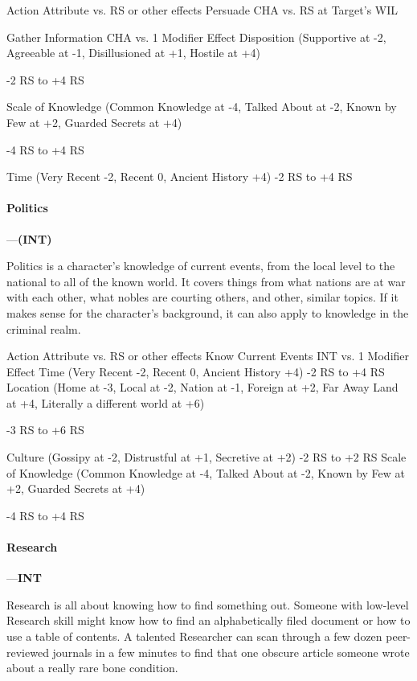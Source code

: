 \documentclass[oneside,11pt,english]{book}
\begin{document}
Action Attribute vs. RS or 
other effects 
Persuade CHA vs. RS at Target’s 
WIL 


Gather Information CHA vs. 1 
Modifier Effect 
Disposition (Supportive at -2, Agreeable at -1, Disillusioned at +1, Hostile at +4)

-2 RS to +4 RS 

Scale of Knowledge (Common Knowledge at -4, Talked About at -2, Known 
by Few at +2, Guarded Secrets at +4) 

-4 RS to +4 RS 

Time (Very Recent -2, Recent 0, Ancient History +4) -2 RS to +4 RS 

 

 

 

\paragraph{\label{skill:Politics}Politics}---\quad\textbf{(INT) }\par
Politics is a character’s knowledge of current events, from the local level to the national to all of the 
known world. It covers things from what nations are at war with each other, what nobles are courting 
others, and other, similar topics. If it makes sense for the character’s background, it can also apply to 
knowledge in the criminal realm. 

 

Action Attribute vs. RS or 
other effects 
Know Current Events INT vs. 1 
Modifier Effect 
Time (Very Recent -2, Recent 0, Ancient History +4) -2 RS to +4 RS 
Location (Home at -3, Local at -2, Nation at -1, Foreign at +2, Far Away Land 
at +4, Literally a different world at +6) 

-3 RS to +6 RS 

Culture (Gossipy at -2, Distrustful at +1, Secretive at +2) -2 RS to +2 RS 
Scale of Knowledge (Common Knowledge at -4, Talked About at -2, Known 
by Few at +2, Guarded Secrets at +4) 

-4 RS to +4 RS 

 

 

 

\paragraph{\label{skill:Research}Research}---\quad\textbf{INT}\par
Research is all about knowing how to find something out. Someone with low-level Research skill might know how to find an alphabetically filed document or how to use a table of contents. A talented Researcher can scan through a few dozen peer-reviewed journals in a few minutes to find that one obscure article someone wrote about a really rare bone condition.
\end{document}
